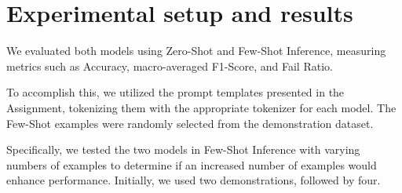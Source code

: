 \documentclass[11pt]{article}
\begin{document}






\section{Experimental setup and results}
\label{sec:results}
We evaluated both models using Zero-Shot and Few-Shot Inference, measuring metrics such as Accuracy, macro-averaged F1-Score, and Fail Ratio.

To accomplish this, we utilized the prompt templates presented in the Assignment, tokenizing them with the appropriate tokenizer for each model. The Few-Shot examples were randomly selected from the demonstration dataset.

Specifically, we tested the two models in Few-Shot Inference with varying numbers of examples to determine if an increased number of examples would enhance performance. Initially, we used two demonstrations, followed by four.
\end{document}

